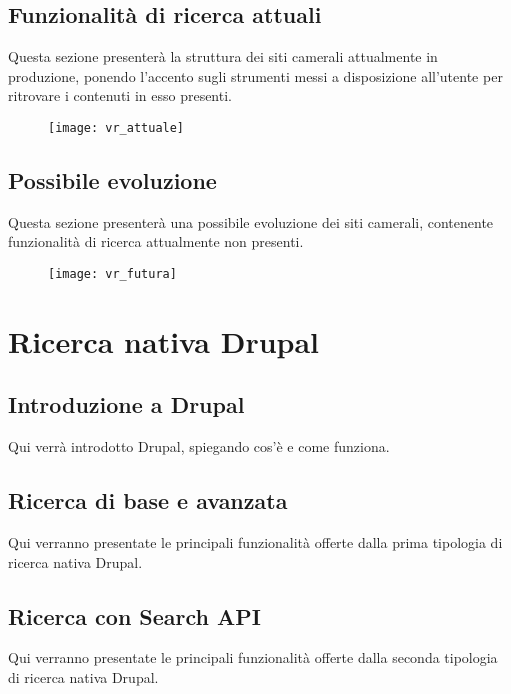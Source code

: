 		\subsection{Funzionalità di ricerca attuali}
		Questa sezione presenterà la struttura dei siti camerali attualmente in produzione, ponendo l'accento sugli strumenti messi a disposizione all'utente per ritrovare i contenuti in esso presenti.
		
		\begin{figure}[htbp]
			\begin{center}
				\texttt{[image: vr\_attuale]}
			\end{center}
		\end{figure}
		
		
		\subsection{Possibile evoluzione}
		Questa sezione presenterà una possibile evoluzione dei siti camerali, contenente funzionalità di ricerca attualmente non presenti.
		
		\begin{figure}[htbp]
			\begin{center}
				\texttt{[image: vr\_futura]}
			\end{center}
		\end{figure}

	\section{Ricerca nativa Drupal}

		\subsection{Introduzione a Drupal}
		Qui verrà introdotto Drupal, spiegando cos'è e come funziona.
		
		\subsection{Ricerca di base e avanzata}
		Qui verranno presentate le principali funzionalità offerte dalla prima tipologia di ricerca nativa Drupal.
		
		\subsection{Ricerca con Search API}
		Qui verranno presentate le principali funzionalità offerte dalla seconda tipologia di ricerca nativa Drupal.
		
